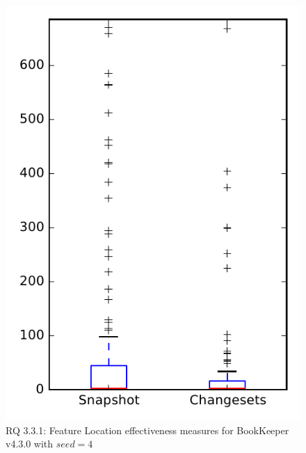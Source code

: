 
\begin{figure}
\centering
\includegraphics[height=0.4\textheight]{figures/flt_seed/rq1_bookkeeper_4}
\caption{RQ 3.3.1: Feature Location effectiveness measures for BookKeeper v4.3.0 with $seed=4$}
\label{fig:flt_seed:rq1:bookkeeper}
\end{figure}
